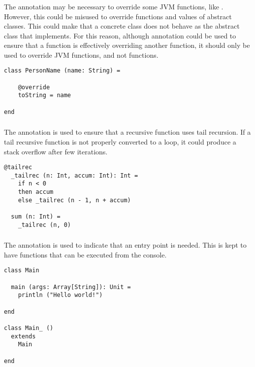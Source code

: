 \subsubsection{\sodaoverride}

The \sodaoverride annotation may be necessary to override some JVM functions, like .
However, this could be misused to override functions and values of abstract classes.
This could make that a concrete class does not behave as the abstract class that implements.
For this reason, although \sodaoverride annotation could be used to ensure that a function is effectively overriding another function, it should only be used to override JVM functions, and not \Soda functions.

\begin{lstlisting}[label={lst:exampleOverride}]
class PersonName (name: String) =

    @override
    toString = name

end
\end{lstlisting}

\subsubsection{\sodatailrec}

The \sodatailrec annotation is used to ensure that a recursive function uses tail recursion.
If a tail recursive function is not properly converted to a loop, it could produce a stack overflow after few iterations.

\begin{lstlisting}[label={lst:exampleTailrecInside}]
  @tailrec
  _tailrec (n: Int, accum: Int): Int =
    if n < 0
    then accum
    else _tailrec (n - 1, n + accum)

  sum (n: Int) =
    _tailrec (n, 0)
\end{lstlisting}

\subsubsection{\sodamain}

The \sodamain annotation is used to indicate that an entry point is needed.
This is kept to have functions that can be executed from the console.

\begin{lstlisting}[label={lst:exampleMain}]
class Main

  main (args: Array[String]): Unit =
    println ("Hello world!")

end

class Main_ ()
  extends
    Main

end
\end{lstlisting}

